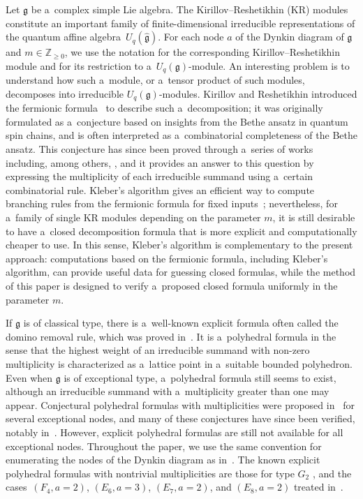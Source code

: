 \documentclass[pdftex]{sigma}
\numberwithin{equation}{section}
\theoremstyle{definition}
\newcommand{\Z}{\mathbb{Z}}
\newcommand{\g}{\mathfrak{g}}
\newcommand{\res}{\operatorname{res}}
\newcommand\uqg{U_q(\g)}
\newcommand\uqghat{U_q(\widehat{\g})}
\begin{document}
Let $\g$ be a~complex simple Lie algebra.
The Kirillov--Reshetikhin (KR) modules constitute an important family of finite-dimensional irreducible representations of the quantum affine algebra~$\uqghat$.
For each node $a$ of the Dynkin diagram of $\g$ and $m\in \Z_{\geq 0}$, we use the notation  for the corresponding Kirillov--Reshetikhin module and \smash{$\res W^{(a)}_m$} for its restriction to a~$\uqg$-module.
An interesting problem is to understand how such a~module, or a~tensor product of such modules, decomposes into irreducible $U_q(\mathfrak{g})$-modules.
Kirillov and Reshetikhin introduced the fermionic formula~\cite{MR906858} to describe such a~decomposition; it was originally formulated as a~conjecture based on insights from the Bethe ansatz in quantum spin chains, and is often interpreted as a~combinatorial completeness of the Bethe ansatz.
This conjecture has since been proved through a~series of works including, among others, \cite{MR2428305,MR1745263, MR2254805, MR1993360}, and it provides an answer to this question by expressing the multiplicity of each irreducible summand using a~certain combinatorial rule.
Kleber's algorithm gives an efficient way to compute branching rules from the fermionic formula for fixed inputs~\cite{MR1436775}; nevertheless, for a~family of single KR modules depending on the parameter $m$, it is still desirable to have a~closed decomposition formula that is more explicit and computationally cheaper to use.
In this sense, Kleber's algorithm is complementary to the present approach: computations based on the fermionic formula, including Kleber's algorithm, can provide useful data for guessing closed formulas, while the method of this paper is designed to verify a~proposed closed formula uniformly in the parameter $m$.

If $\g$ is of classical type, there is a~well-known explicit formula often called the domino removal rule, which was proved in~\cite{MR1836791}. It is a~polyhedral formula in the sense that the highest weight of an irreducible summand with non-zero multiplicity is characterized as a~lattice point in a~suitable bounded polyhedron.
Even when $\g$ is of exceptional type, a~polyhedral formula still seems to exist, although an irreducible summand with a~multiplicity greater than one may appear.
Conjectural polyhedral formulas with multiplicities were proposed in~\cite{MR1745263} for several exceptional nodes, and many of these conjectures have since been verified, notably in~\cite{MR4114424}.
However, explicit polyhedral formulas are still not available for all exceptional nodes.
Throughout the paper, we use the same convention for enumerating the nodes of the Dynkin diagram as in~\cite{MR1745263}.
The known explicit polyhedral formulas with nontrivial multiplicities are those for type $G_2$ \cite{MR2238884}, and the cases~${(F_4,a=2)}$, $(E_6,a=3)$, $(E_7,a=2)$, and $(E_8,a=2)$ treated in~\cite{MR4114424}.
\end{document}

